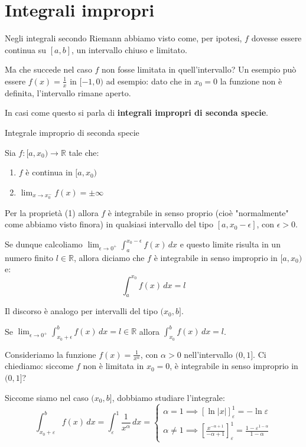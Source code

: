 \documentclass[12pt]{report}
\newcommand{\R}{\mathbb{R}}
\begin{document}
	\chapter{Integrali impropri}
	
	Negli integrali secondo Riemann abbiamo visto come, per ipotesi, $f$ dovesse essere continua su $[a, b]$, un intervallo chiuso e limitato.
	
	Ma che succede nel caso $f$ non fosse limitata in quell'intervallo?
	Un esempio può essere $f(x) = \frac{1}{x}$ in $[-1, 0)$ ad esempio: dato che in $x_0 = 0$ la funzione non è definita, l'intervallo rimane aperto.
	
	In casi come questo si parla di \textbf{integrali impropri di seconda specie}.
	
	\begin{definizione}{Integrale improprio di seconda specie}{}
		
		Sia $f: [a, x_0) \to \R$ tale che:
		\begin{enumerate}
			
			\item $f$ è continua in $[a, x_0)$
			
			\item $\lim_{x \to x_0^-} f(x) = \pm\infty$
			
		\end{enumerate}
		
	\end{definizione}
	
	Per la proprietà (1) allora $f$ è integrabile in senso proprio (cioè "normalmente" come abbiamo visto finora) in qualsiasi intervallo del tipo $[a, x_0 - \epsilon]$, con $\epsilon > 0$.
	
	Se dunque calcoliamo $\lim_{\epsilon \to 0^+} \int_{a}^{x_0 - \epsilon} f(x) \, dx$ e questo limite risulta in un numero finito $l \in \R$, allora diciamo che $f$ è integrabile in senso improprio in $[a, x_0)$ e:
	\[
	\int_{a}^{x_0} f(x) \, dx = l
	\]
	
	Il discorso è analogo per intervalli del tipo $(x_0, b]$.
	
	Se $\lim_{\epsilon \to 0^+} \int_{x_0 + \epsilon}^{b} f(x) \, dx = l \in \R$ allora $\int_{x_0}^{b} f(x) \, dx = l$.
	
	Consideriamo la funzione $f(x) = \frac{1}{x^\alpha}$, con $\alpha > 0$ nell'intervallo $(0, 1]$. 
	Ci chiediamo: siccome $f$ non è limitata in $x_0 = 0$, è integrabile in senso improprio in $(0, 1]$?
	
	Siccome siamo nel caso $(x_0, b]$, dobbiamo studiare l'integrale:
	\[
	\int_{x_0 + \varepsilon}^{b} f(x) \, dx = \int_{\varepsilon}^{1} \frac{1}{x^\alpha} \, dx = 
	\begin{cases}
		\alpha = 1 \implies [\ln|x|]_\varepsilon^1 = -\ln\varepsilon \\
		\alpha \neq 1 \implies \left[ \frac{x^{-\alpha + 1}}{-\alpha + 1} \right]_\varepsilon^1 = \frac{1 - \varepsilon^{1-\alpha}}{1 - \alpha}
	\end{cases}
	\]
	
\end{document}
